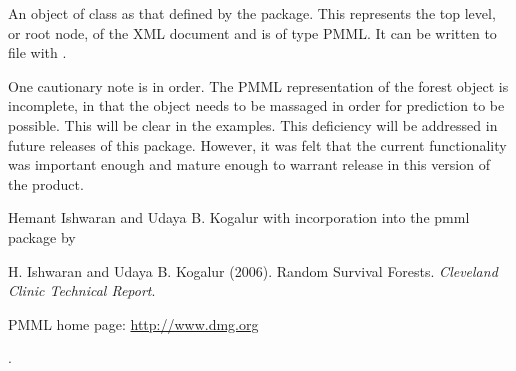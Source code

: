 \begin{Value}
An object of class  as that defined by the 
package.  This represents the top level, or root node, of the XML
document and is of type PMML. It can be written to file with
.
\end{Value}
\begin{Note}\relax
One cautionary note is in order.  The PMML representation of the
 forest object is incomplete, in that the
object needs to be massaged in order for prediction to be possible.
This will be clear in the examples.  This deficiency will be addressed
in future releases of this package.  However, it was felt that the
current functionality was important enough and mature enough to
warrant release in this version of the product.
\end{Note}
\begin{Author}\relax
Hemant Ishwaran  and Udaya B. Kogalur
 with incorporation into the pmml package
by 
\end{Author}
\begin{References}\relax
H. Ishwaran and Udaya B. Kogalur (2006).  Random Survival Forests.
\emph{Cleveland Clinic Technical Report}.

PMML home page: \url{http://www.dmg.org}
\end{References}
\begin{SeeAlso}\relax
{}.
\end{SeeAlso}
\begin{Examples}
\end{Examples}

